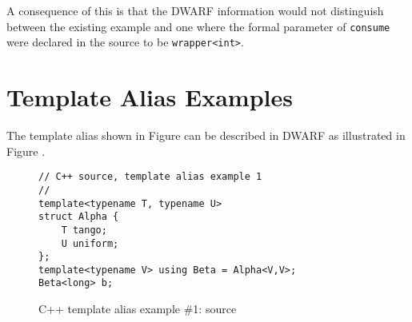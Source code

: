 A consequence of this is that the DWARF information would
not distinguish between the existing example and one where
the formal parameter of \texttt{consume} were declared in the source to be
\texttt{wrapper\textless int\textgreater}.


\section{Template Alias Examples}
\label{app:templatealiasexample}

The  template alias shown in
Figure 
can be described in DWARF as illustrated 
 in 
Figure .

\begin{figure}[h]
\begin{lstlisting}
// C++ source, template alias example 1
//
template<typename T, typename U>
struct Alpha {
    T tango;
    U uniform;
};
template<typename V> using Beta = Alpha<V,V>;
Beta<long> b;
\end{lstlisting}
\caption{C++ template alias example \#1: source}
\label{fig:ctemplatealiasexample1source}
\end{figure}

